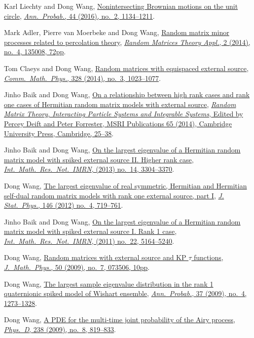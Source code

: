 \documentclass[12pt, a4paper]{article}
\begin{document}
\begin{etaremune}
\item
  Karl Liechty and Dong Wang, \href{http://arxiv.org/abs/1312.7390}{Nonintersecting Brownian motions on the unit circle}, \href{https://doi.org/10.1214/14-AOP998}{\textit{Ann.\ Probab.}, 44 (2016), no.\ 2, 1134--1211}.
\item 
  Mark Adler, Pierre van Moerbeke and Dong Wang,
  \href{http://arxiv.org/abs/1301.7017}{Random matrix minor processes related to percolation theory}, \href{https://doi.org/10.1142/S2010326313500081}{\textit{Random Matrices Theory Appl.}, 2 (2014), no.\ 4, 135008, 72pp}.
\item 
  Tom Claeys and Dong Wang,
  \href{http://arxiv.org/abs/1212.3768}{Random matrices with equispaced external source}, \href{https://doi.org/10.1007/s00220-014-1988-y}{\textit{Comm.\ Math.\ Phys.}, 328 (2014), no.\ 3, 1023--1077}.
\item Jinho Baik and Dong Wang,
  \href{http://arxiv.org/abs/1207.0389}{On a relationship between high rank cases and rank one cases of Hermitian random matrix models with external source}, \href{http://www.cambridge.org/asia/catalogue/catalogue.asp?isbn=9781107079922}{\textit{Random Matrix Theory, Interacting Particle Systems and Integrable Systems}, Edited by Percey Deift and Peter Forrester, MSRI Publications 65 (2014), Cambridge University Press, Cambridge, 25--38}.
\item Jinho Baik and Dong Wang,
  \href{http://arxiv.org/abs/1104.2915}{On the largest eigenvalue of a Hermitian random matrix model with spiked external source II. Higher rank case}, \href{https://doi.org/10.1093/imrn/rns136}{\textit{Int.\ Math.\ Res.\ Not.\ IMRN}, (2013) no.\ 14, 3304--3370}.
\item Dong Wang,
  \href{http://arxiv.org/abs/1012.4144}{The largest eigenvalue of real symmetric, Hermitian and Hermitian self-dual random matrix models with rank one external source, part I}, \href{https://doi.org/10.1007/s10955-012-0417-x}{\textit{J. Stat.\ Phys.}, 146 (2012) no.\ 4, 719--761}.
\item Jinho Baik and  Dong Wang,
  \href{http://arxiv.org/abs/1010.4604}{On the largest eigenvalue of a Hermitian random matrix model with spiked external source I. Rank 1 case}, \href{https://doi.org/10.1093/imrn/rnq257}{\textit{Int.\ Math.\ Res.\ Not.\ IMRN}, (2011) no.\ 22, 5164--5240}.
\item Dong Wang,
  \href{http://arxiv.org/abs/0810.0280}{Random matrices with external source and KP $\tau$ functions}, \href{https://doi.org/10.1063/1.3167802}{\textit{J.\ Math.\ Phys.}, 50 (2009), no.\ 7, 073506, 10pp}.
\item Dong Wang,
 \href{http://arxiv.org/abs/0711.2722}{The largest sample eigenvalue distribution in the rank 1 quaternionic spiked model of Wishart ensemble}, \href{https://doi.org/10.1214/08-AOP432}{\textit{Ann.\ Probab.}, 37 (2009), no.\ 4, 1273--1328}.
\item Dong Wang,
  \href{http://arxiv.org/abs/0711.3797}{A PDE for the multi-time joint probability of the Airy process}, \href{https://doi.org/10.1016/j.physd.2009.02.007}{\textit{Phys.\ D}, 238 (2009), no.\ 8, 819--833}.
\end{etaremune}
\end{document}
